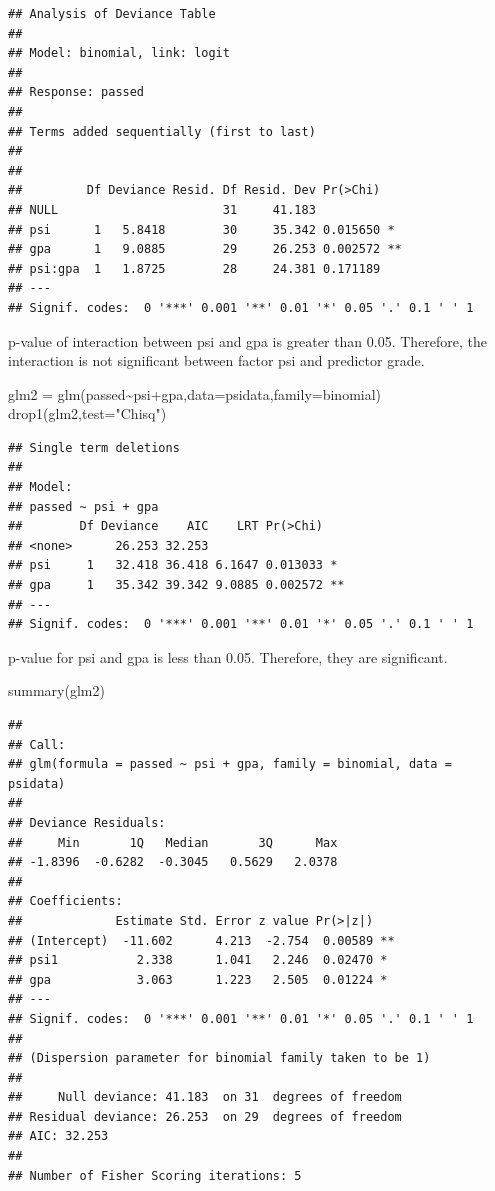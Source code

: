\documentclass[
]{article}
\newenvironment{Shaded}{\begin{snugshade}}{\end{snugshade}}
\newcommand{\AttributeTok}[1]{\textcolor[rgb]{0.77,0.63,0.00}{#1}}
\newcommand{\FunctionTok}[1]{\textcolor[rgb]{0.00,0.00,0.00}{#1}}
\newcommand{\NormalTok}[1]{#1}
\newcommand{\OtherTok}[1]{\textcolor[rgb]{0.56,0.35,0.01}{#1}}
\newcommand{\SpecialCharTok}[1]{\textcolor[rgb]{0.00,0.00,0.00}{#1}}
\newcommand{\StringTok}[1]{\textcolor[rgb]{0.31,0.60,0.02}{#1}}
\begin{document}
\begin{verbatim}
## Analysis of Deviance Table
## 
## Model: binomial, link: logit
## 
## Response: passed
## 
## Terms added sequentially (first to last)
## 
## 
##         Df Deviance Resid. Df Resid. Dev Pr(>Chi)   
## NULL                       31     41.183            
## psi      1   5.8418        30     35.342 0.015650 * 
## gpa      1   9.0885        29     26.253 0.002572 **
## psi:gpa  1   1.8725        28     24.381 0.171189   
## ---
## Signif. codes:  0 '***' 0.001 '**' 0.01 '*' 0.05 '.' 0.1 ' ' 1
\end{verbatim}

p-value of interaction between psi and gpa is greater than 0.05.
Therefore, the interaction is not significant between factor psi and
predictor grade.

\begin{Shaded}
\begin{Highlighting}[]
\NormalTok{glm2 }\OtherTok{=} \FunctionTok{glm}\NormalTok{(passed}\SpecialCharTok{\textasciitilde{}}\NormalTok{psi}\SpecialCharTok{+}\NormalTok{gpa,}\AttributeTok{data=}\NormalTok{psidata,}\AttributeTok{family=}\NormalTok{binomial)}
\FunctionTok{drop1}\NormalTok{(glm2,}\AttributeTok{test=}\StringTok{"Chisq"}\NormalTok{)}
\end{Highlighting}
\end{Shaded}

\begin{verbatim}
## Single term deletions
## 
## Model:
## passed ~ psi + gpa
##        Df Deviance    AIC    LRT Pr(>Chi)   
## <none>      26.253 32.253                   
## psi     1   32.418 36.418 6.1647 0.013033 * 
## gpa     1   35.342 39.342 9.0885 0.002572 **
## ---
## Signif. codes:  0 '***' 0.001 '**' 0.01 '*' 0.05 '.' 0.1 ' ' 1
\end{verbatim}

p-value for psi and gpa is less than 0.05. Therefore, they are
significant.

\begin{Shaded}
\begin{Highlighting}[]
\FunctionTok{summary}\NormalTok{(glm2)}
\end{Highlighting}
\end{Shaded}

\begin{verbatim}
## 
## Call:
## glm(formula = passed ~ psi + gpa, family = binomial, data = psidata)
## 
## Deviance Residuals: 
##     Min       1Q   Median       3Q      Max  
## -1.8396  -0.6282  -0.3045   0.5629   2.0378  
## 
## Coefficients:
##             Estimate Std. Error z value Pr(>|z|)   
## (Intercept)  -11.602      4.213  -2.754  0.00589 **
## psi1           2.338      1.041   2.246  0.02470 * 
## gpa            3.063      1.223   2.505  0.01224 * 
## ---
## Signif. codes:  0 '***' 0.001 '**' 0.01 '*' 0.05 '.' 0.1 ' ' 1
## 
## (Dispersion parameter for binomial family taken to be 1)
## 
##     Null deviance: 41.183  on 31  degrees of freedom
## Residual deviance: 26.253  on 29  degrees of freedom
## AIC: 32.253
## 
## Number of Fisher Scoring iterations: 5
\end{verbatim}
\end{document}
